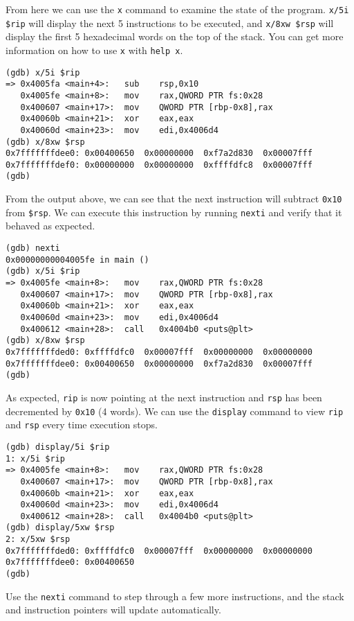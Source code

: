 \documentclass{article}
\begin{document}
From here we can use the \texttt{x} command to examine the state of the program.
\texttt{x/5i \$rip} will display the next 5 instructions to be executed, and
\texttt{x/8xw \$rsp} will display the first 5 hexadecimal words on the top of
the stack. You can get more information on how to use \texttt{x} with
\texttt{help x}.

\begin{lstlisting}
(gdb) x/5i $rip
=> 0x4005fa <main+4>:	sub    rsp,0x10
   0x4005fe <main+8>:	mov    rax,QWORD PTR fs:0x28
   0x400607 <main+17>:	mov    QWORD PTR [rbp-0x8],rax
   0x40060b <main+21>:	xor    eax,eax
   0x40060d <main+23>:	mov    edi,0x4006d4
(gdb) x/8xw $rsp
0x7fffffffdee0:	0x00400650	0x00000000	0xf7a2d830	0x00007fff
0x7fffffffdef0:	0x00000000	0x00000000	0xffffdfc8	0x00007fff
(gdb) 
\end{lstlisting}

From the output above, we can see that the next instruction will subtract
\texttt{0x10} from \texttt{\$rsp}. We can execute this instruction by running
\texttt{nexti} and verify that it behaved as expected.

\begin{lstlisting}
(gdb) nexti
0x00000000004005fe in main ()
(gdb) x/5i $rip
=> 0x4005fe <main+8>:	mov    rax,QWORD PTR fs:0x28
   0x400607 <main+17>:	mov    QWORD PTR [rbp-0x8],rax
   0x40060b <main+21>:	xor    eax,eax
   0x40060d <main+23>:	mov    edi,0x4006d4
   0x400612 <main+28>:	call   0x4004b0 <puts@plt>
(gdb) x/8xw $rsp
0x7fffffffded0:	0xffffdfc0	0x00007fff	0x00000000	0x00000000
0x7fffffffdee0:	0x00400650	0x00000000	0xf7a2d830	0x00007fff
(gdb) 
\end{lstlisting}

As expected, \texttt{rip} is now pointing at the next instruction and
\texttt{rsp} has been decremented by \texttt{0x10} (4 words). We can use the
\texttt{display} command to view \texttt{rip} and \texttt{rsp} every time
execution stops.

\begin{lstlisting}
(gdb) display/5i $rip
1: x/5i $rip
=> 0x4005fe <main+8>:	mov    rax,QWORD PTR fs:0x28
   0x400607 <main+17>:	mov    QWORD PTR [rbp-0x8],rax
   0x40060b <main+21>:	xor    eax,eax
   0x40060d <main+23>:	mov    edi,0x4006d4
   0x400612 <main+28>:	call   0x4004b0 <puts@plt>
(gdb) display/5xw $rsp
2: x/5xw $rsp
0x7fffffffded0:	0xffffdfc0	0x00007fff	0x00000000	0x00000000
0x7fffffffdee0:	0x00400650
(gdb) 
\end{lstlisting}

Use the \texttt{nexti} command to step through a few more instructions, and
the stack and instruction pointers will update automatically.
\end{document}
